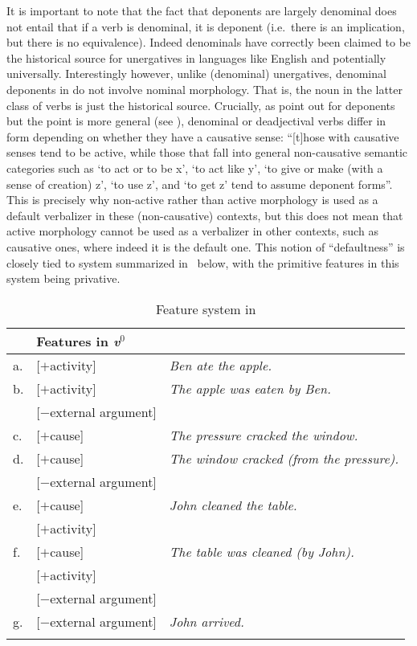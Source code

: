 \documentclass[output=paper]{langsci/langscibook}
\begin{document}
It is important to note that the fact that deponents are largely denominal does
not entail that if a verb is denominal, it is deponent (i.e.\ there is an
implication, but there is no equivalence). Indeed denominals have correctly
been claimed to be the historical source for unergatives in languages like
English and potentially universally. Interestingly however, unlike (denominal)
unergatives, denominal deponents in  do not involve nominal morphology.
That is, the noun in the latter class of verbs is just the historical source.
Crucially, as \textcite[139]{Xuetal2007} point out for  deponents but the
point is more general (see \citealt{Kallulli2013}),  denominal or
deadjectival verbs differ in form depending on whether they have a causative
sense: “[t]hose with causative senses tend to be active, while those that fall
into general non-causative semantic categories such as ‘to act or to be x’, ‘to
act like y’, ‘to give or make (with a sense of creation) z’, ‘to use z’, and
‘to get z’ tend to assume deponent forms”. This is precisely why non-active
rather than active morphology is used as a default verbalizer in these
(non-causative) contexts, but this does not mean that active morphology cannot
be used as a verbalizer in other contexts, such as causative ones, where indeed
it is the default one. This notion of \enquote{defaultness} is closely
tied to  system summarized in~ below, with
the primitive features in this system being privative.

\begin{table}[htpb]
    \centering
    \begin{tabular}{lll}
    \lsptoprule
    & Features in \emph{v}$^0$  & \\
    \midrule
    a.  & [$+$activity]             & \emph{Ben ate the apple.}\\
    b.  & [$+$activity]             & \emph{The apple was eaten by Ben.}\\
        & [$-$external argument]    & \\
    c.  & [$+$cause]                & \emph{The pressure cracked the window.}\\
    d.  & [$+$cause]                & \emph{The window cracked (from the pressure).} \\
        & [$-$external argument]    & \\
    e.  & [$+$cause]                & \emph{John cleaned the table.}\\
        & [$+$activity]             & \\
    f.  & [$+$cause]                & \emph{The table was cleaned (by John).}\\
        & [$+$activity]             & \\
        & [$-$external argument]    & \\
    g.  & [$-$external argument]    & \emph{John arrived.}\\
    \lspbottomrule
    \end{tabular}
    \caption{Feature system in \textcite{Kallulli2007}}\label{tb:10.1}
\end{table}
\end{document}
